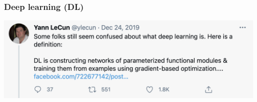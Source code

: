 \documentclass{beamer}
\begin{document}
    

    

    \begin{frame}
        \frametitle{Deep learning (DL)}

        \begin{center}
        \includegraphics[scale=0.35]{lecundef.png}
        \end{center}
    \end{frame}
\end{document}
